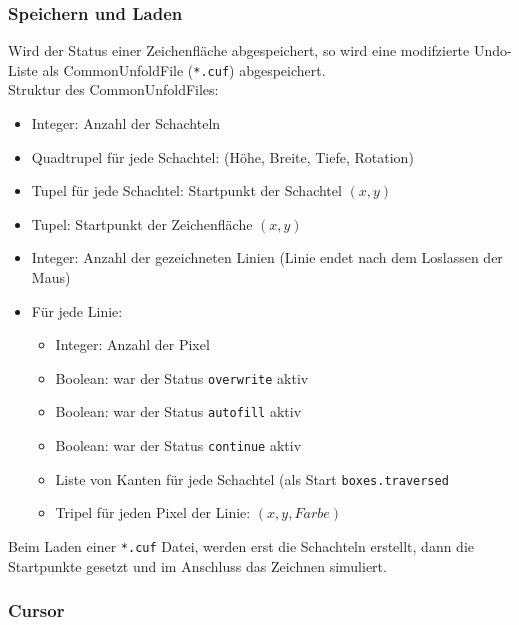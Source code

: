 \subsubsection{Speichern und Laden}
\label{subsubsec:speichernLaden}
Wird der Status einer Zeichenfläche abgespeichert, so wird eine modifzierte Undo-Liste als CommonUnfoldFile (\texttt{*.cuf}) abgespeichert.\\

Struktur des CommonUnfoldFiles:

\begin{itemize}
\item Integer: Anzahl der Schachteln
\item Quadtrupel für jede Schachtel: (Höhe, Breite, Tiefe, Rotation)
\item Tupel für jede Schachtel: Startpunkt der Schachtel $(x,y)$
\item Tupel: Startpunkt der Zeichenfläche $(x,y)$
\item Integer: Anzahl der gezeichneten Linien (Linie endet nach dem Loslassen der Maus)
\item Für jede Linie:
  \begin{itemize}
    \item Integer: Anzahl der Pixel
    \item Boolean: war der Status \texttt{overwrite} aktiv
    \item Boolean: war der Status \texttt{autofill} aktiv
    \item Boolean: war der Status \texttt{continue} aktiv
    \item Liste von Kanten für jede Schachtel (als Start \texttt{boxes.traversed}
    \item Tripel für jeden Pixel der Linie: $(x, y, Farbe)$
  \end{itemize}
\end{itemize}

Beim Laden einer \texttt{*.cuf} Datei, werden erst die Schachteln erstellt, dann die Startpunkte gesetzt und im Anschluss das Zeichnen simuliert.


\subsubsection{Cursor}
\label{subsubsec:cursor}

